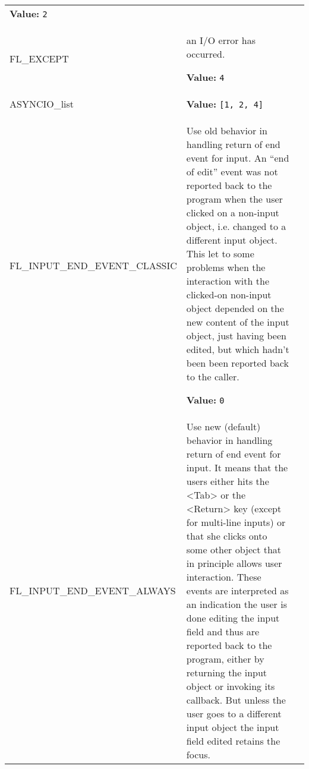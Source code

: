 \begin{longtable}{|p{\varnamewidth}|p{\vardescrwidth}|l}
\textbf{Value:} 
{\tt 2}&\\
\cline{1-2}
\raggedright F\-L\-\_\-E\-X\-C\-E\-P\-T\- & \raggedright an I/O error has occurred.

\textbf{Value:} 
{\tt 4}&\\
\cline{1-2}
\raggedright A\-S\-Y\-N\-C\-I\-O\-\_\-l\-i\-s\-t\- & \raggedright \textbf{Value:} 
{\tt \texttt{[}1\texttt{, }2\texttt{, }4\texttt{]}}&\\
\cline{1-2}
\raggedright F\-L\-\_\-I\-N\-P\-U\-T\-\_\-E\-N\-D\-\_\-E\-V\-E\-N\-T\-\_\-C\-L\-A\-S\-S\-I\-C\- & \raggedright Use old behavior in handling return of end event for input. An ``end of
edit'' event was not reported back to the program when the user clicked on
a non-input object, i.e. changed to a different input object. This let to
some problems when the interaction with the clicked-on non-input object
depended on the new content of the input object, just having been edited,
but which hadn't been been reported back to the caller.

\textbf{Value:} 
{\tt 0}&\\
\cline{1-2}
\raggedright F\-L\-\_\-I\-N\-P\-U\-T\-\_\-E\-N\-D\-\_\-E\-V\-E\-N\-T\-\_\-A\-L\-W\-A\-Y\-S\- & \raggedright Use new (default) behavior in handling return of end event for input. It
means that the users either hits the <Tab> or the <Return> key (except for
multi-line inputs) or that she clicks onto some other object that in
principle allows user interaction. These events are interpreted as an
indication the user is done editing the input field and thus are reported
back to the program, either by returning the input object or invoking its
callback. But unless the user goes to a different input object the input
field edited retains the focus.


\end{longtable}
